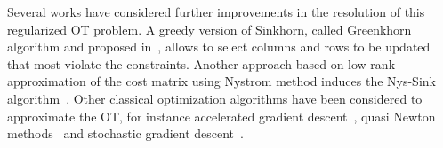 Several works have considered further improvements in the resolution of this regularized OT problem.
A greedy version of Sinkhorn, called Greenkhorn algorithm and proposed in~\cite{altschulernips17}, allows to select columns and rows to be updated that most violate the constraints.                   
Another approach based on low-rank approximation of the cost matrix using Nystrom method induces the Nys-Sink algorithm~\citep{altschuler2018Nystrom}. 
Other classical optimization algorithms have been considered to approximate the OT, for instance accelerated gradient descent~\citep{xie2018proxpointOT,dvurechensky18aICML,lin2019}, quasi Newton methods~\citep{blondel2018ICML,cuturi2016SIAM} and stochastic gradient descent~\citep{genevay2016stochOT,khalilabid2018}. 

